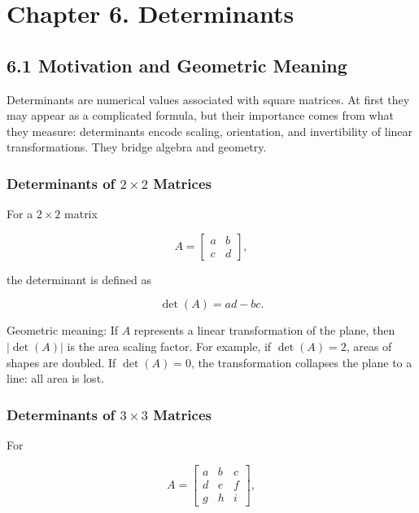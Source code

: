 \documentclass[
  12pt,
  a4paper,
]{article}
\let\oldsection\section
\renewcommand{\section}{\clearpage\oldsection}
\begin{document}
\section{Chapter 6. Determinants}\label{chapter-6-determinants}

\subsection{6.1 Motivation and Geometric
Meaning}\label{61-motivation-and-geometric-meaning}

Determinants are numerical values associated with square matrices. At
first they may appear as a complicated formula, but their importance
comes from what they measure: determinants encode scaling, orientation,
and invertibility of linear transformations. They bridge algebra and
geometry.

\subsubsection{\texorpdfstring{Determinants of \(2 \times 2\)
Matrices}{Determinants of 2 \textbackslash times 2 Matrices}}\label{determinants-of--2-uxd7-2--matrices}

For a \(2 \times 2\) matrix

\[A = \begin{bmatrix} a & b \\ c & d \end{bmatrix},\]

the determinant is defined as

\[\det(A) = ad - bc.\]

Geometric meaning: If \(A\) represents a linear transformation of the
plane, then \(|\det(A)|\) is the area scaling factor. For example, if
\(\det(A) = 2\), areas of shapes are doubled. If \(\det(A) = 0\), the
transformation collapses the plane to a line: all area is lost.

\subsubsection{\texorpdfstring{Determinants of \(3 \times 3\)
Matrices}{Determinants of 3 \textbackslash times 3 Matrices}}\label{determinants-of--3-uxd7-3--matrices}

For

\[A = \begin{bmatrix}
a & b & c \\
d & e & f \\
g & h & i
\end{bmatrix},\]
\end{document}
